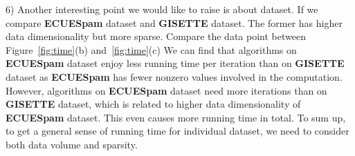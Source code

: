 \documentclass[10pt, conference, compsocconf]{IEEEtran}
\begin{document}
6) Another interesting point we would like to raise is about dataset. If we compare \textbf{ECUESpam} dataset and \textbf{GISETTE} dataset.
          The former has higher data dimensionality but more sparse.
          Compare the data point between Figure~\ref{fig:time}(b) and~\ref{fig:time}(c) We can find that algorithms on \textbf{ECUESpam} dataset enjoy less running time per iteration than on \textbf{GISETTE} dataset as \textbf{ECUESpam} has fewer nonzero values involved in the computation.
          However, algorithms on \textbf{ECUESpam} dataset need more iterations than on \textbf{GISETTE} dataset, which is related to higher data dimensionality of \textbf{ECUESpam} dataset. This even causes more running time in total.
          To sum up, to get a general sense of running time for individual dataset, we need to consider both data volume and sparsity.
\end{document}
